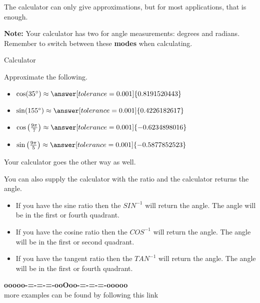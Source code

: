 \documentclass{ximera}
\begin{document}
The calculator can only give approximations, but for most applications, that is enough.


\textbf{Note:}  Your calculator has two  for angle measurements: degrees and radians.  Remember to switch between these \textbf{modes} when calculating.



\begin{question} Calculator 

Approximate the following.

\begin{itemize}
\item $\cos(35^{\circ}) \approx \answer[tolerance=0.001]{0.8191520443}$
\item $\sin(155^{\circ}) \approx \answer[tolerance=0.001]{0.4226182617}$
\item $\cos\left( \frac{9\pi}{7} \right) \approx \answer[tolerance=0.001]{-0.6234898016}$
\item $\sin\left( \frac{9\pi}{5} \right) \approx \answer[tolerance=0.001]{-0.5877852523}$
\end{itemize}

\end{question}





Your calculator goes the other way as well. 




You can also supply the calculator with the ratio and the calculator returns the angle.

\begin{itemize}
\item If you have the sine ratio then the $SIN^{-1}$ will return the angle. The angle will be in the first or fourth quadrant.
\item If you have the cosine ratio then the $COS^{-1}$ will return the angle. The angle will be in the first or second quadrant.
\item If you have the tangent ratio then the $TAN^{-1}$ will return the angle. The angle will be in the first or fourth quadrant.
\end{itemize}
























\begin{onlineOnly}
\begin{center}
\textbf{\textcolor{green!50!black}{ooooo-=-=-=-ooOoo-=-=-=-ooooo}} \\

more examples can be found by following this link\\ 

\end{center}
\end{onlineOnly}
\end{document}
